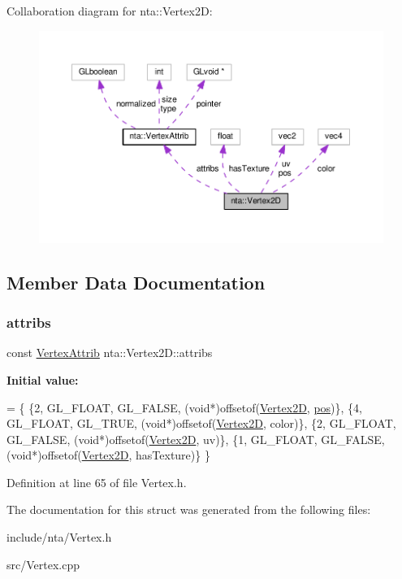 Collaboration diagram for nta\+:\+:Vertex2D\+:
\nopagebreak
\begin{figure}[H]
\begin{center}
\leavevmode
\includegraphics[width=350pt]{df/deb/structnta_1_1Vertex2D__coll__graph}
\end{center}
\end{figure}


\subsection{Member Data Documentation}
\mbox{\label{structnta_1_1Vertex2D_a6be835338c31e6ce40e1a2f5a3039560}} 
\subsubsection{\texorpdfstring{attribs}{attribs}}
{\footnotesize\ttfamily const \hyperlink{namespacenta_df/d9d/structnta_1_1VertexAttrib}{Vertex\+Attrib} nta\+::\+Vertex2\+D\+::attribs\hspace{0.3cm}{\ttfamily [static]}}

{\bfseries Initial value\+:}
\begin{DoxyCode}
= \{
        \{2, GL\_FLOAT, GL\_FALSE, (\textcolor{keywordtype}{void}*)offsetof(\hyperlink{structnta_1_1Vertex2D_a696744d55f56ae170684266eab073c0f}{Vertex2D}, \hyperlink{structnta_1_1Vertex2D_a27a44e1ca52b5a5a13d37495e9376636}{pos})\},
        \{4, GL\_FLOAT, GL\_TRUE,  (\textcolor{keywordtype}{void}*)offsetof(\hyperlink{structnta_1_1Vertex2D_a696744d55f56ae170684266eab073c0f}{Vertex2D}, color)\},
        \{2, GL\_FLOAT, GL\_FALSE, (\textcolor{keywordtype}{void}*)offsetof(\hyperlink{structnta_1_1Vertex2D_a696744d55f56ae170684266eab073c0f}{Vertex2D}, uv)\},
        \{1, GL\_FLOAT, GL\_FALSE, (\textcolor{keywordtype}{void}*)offsetof(\hyperlink{structnta_1_1Vertex2D_a696744d55f56ae170684266eab073c0f}{Vertex2D}, hasTexture)\}
    \}
\end{DoxyCode}


Definition at line 65 of file Vertex.\+h.



The documentation for this struct was generated from the following files\+:\begin{DoxyCompactItemize}
\item 
include/nta/Vertex.\+h\item 
src/Vertex.\+cpp\end{DoxyCompactItemize}
